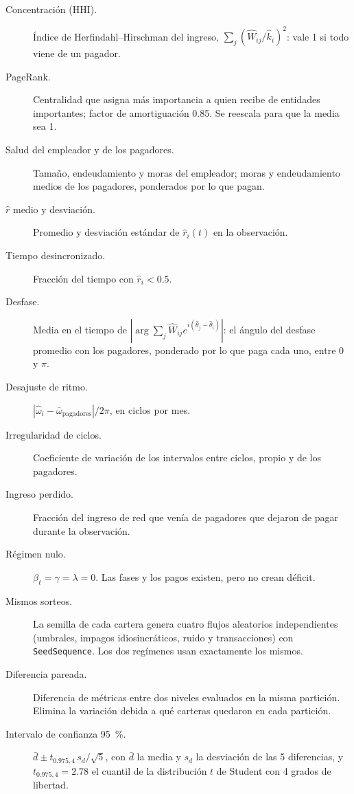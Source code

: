 \begin{terminos}
\begin{description}
\item[Concentración (HHI).] Índice de Herfindahl–Hirschman del ingreso,
$\sum_j(\hat W_{ij}/\hat k_i)^2$: vale 1 si todo viene de un pagador.
\item[PageRank.] Centralidad que asigna más importancia a quien recibe de entidades
importantes; factor de amortiguación 0.85. Se reescala para que la media sea 1.
\item[Salud del empleador y de los pagadores.] Tamaño, endeudamiento y moras del
empleador; moras y endeudamiento medios de los pagadores, ponderados por lo que pagan.
\item[$\hat r$ medio y desviación.] Promedio y desviación estándar de $\hat r_i(t)$ en la
observación.
\item[Tiempo desincronizado.] Fracción del tiempo con $\hat r_i<0.5$.
\item[Desfase.] Media en el tiempo de $|\arg\sum_j\hat W_{ij}e^{i(\hat\theta_j-
\hat\theta_i)}|$: el ángulo del desfase promedio con los pagadores, ponderado por lo que
paga cada uno, entre $0$ y $\pi$.
\item[Desajuste de ritmo.] $|\hat\omega_i-\bar\omega_\text{pagadores}|/2\pi$, en ciclos
por mes.
\item[Irregularidad de ciclos.] Coeficiente de variación de los intervalos entre ciclos,
propio y de los pagadores.
\item[Ingreso perdido.] Fracción del ingreso de red que venía de pagadores que dejaron de
pagar durante la observación.
\item[Régimen nulo.] $\beta_\ell=\gamma=\lambda=0$. Las fases y los pagos existen, pero no
crean déficit.
\item[Mismos sorteos.] La semilla de cada cartera genera cuatro flujos aleatorios
independientes (umbrales, impagos idiosincráticos, ruido y transacciones) con
\texttt{SeedSequence}. Los dos regímenes usan exactamente los mismos.
\item[Diferencia pareada.] Diferencia de métricas entre dos niveles evaluados en la misma
partición. Elimina la variación debida a qué carteras quedaron en cada partición.
\item[Intervalo de confianza 95~\%.] $\bar d\pm t_{0.975,4}\,s_d/\sqrt5$, con $\bar d$ la
media y $s_d$ la desviación de las 5 diferencias, y $t_{0.975,4}=2.78$ el cuantil de la
distribución $t$ de Student con 4 grados de libertad.
\end{description}
\end{terminos}
\begin{preguntas}
\end{preguntas}
